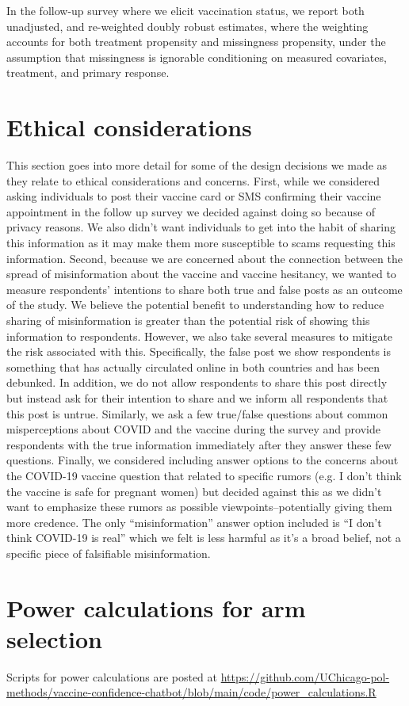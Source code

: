 \documentclass[letterpaper, 12pt, parskip=full,DIV=10]{scrartcl}
\begin{document}
In the follow-up survey where we elicit vaccination status, we report both unadjusted, and re-weighted doubly robust estimates, where the weighting accounts for both treatment propensity and missingness propensity, under the assumption that missingness is ignorable conditioning on measured covariates, treatment, and primary response.  

\section{Ethical considerations}

This section goes into more detail for some of the design decisions we made as they relate to ethical considerations and concerns. First, while we considered asking individuals to post their vaccine card or SMS confirming their vaccine appointment in the follow up survey we decided against doing so because of privacy reasons. We also didn't want individuals to get into the habit of sharing this information as it may make them more susceptible to scams requesting this information. Second, because we are concerned about the connection between the spread of misinformation about the vaccine and vaccine hesitancy, we wanted to measure respondents' intentions to share both true and false posts as an outcome of the study. We believe the potential benefit to understanding how to reduce sharing of misinformation is greater than the potential risk of showing this information to respondents. However, we also take several measures to mitigate the risk associated with this. Specifically, the false post we show respondents is something that has actually circulated online in both countries and has been debunked. In addition, we do not allow respondents to share this post directly but instead ask for their intention to share and we inform all respondents that this post is untrue. Similarly, we ask a few true/false questions about common misperceptions about COVID and the vaccine during the survey and provide respondents with the true information immediately after they answer these few questions. Finally, we considered including answer options to the concerns about the COVID-19 vaccine question that related to specific rumors (e.g. I don't think the vaccine is safe for pregnant women) but decided against this as we didn't want to emphasize these rumors as possible viewpoints--potentially giving them more credence. The only ``misinformation'' answer option included is ``I don't think COVID-19 is real'' which we felt is less harmful as it's a broad belief, not a specific piece of falsifiable misinformation. 

\clearpage


\clearpage
\appendix
\section{Power calculations for arm selection}

Scripts for power calculations are posted at \url{https://github.com/UChicago-pol-methods/vaccine-confidence-chatbot/blob/main/code/power_calculations.R}
\end{document}
